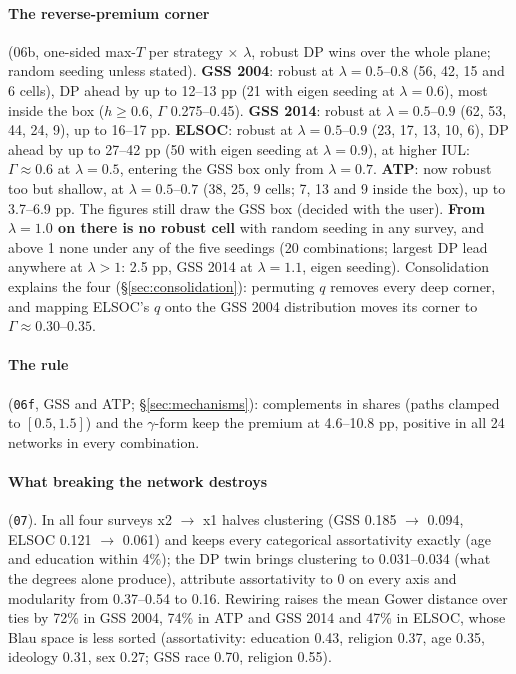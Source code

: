 \documentclass[11pt,a4paper]{article}
\newcommand{\code}[1]{\texttt{#1}}
\begin{document}
\paragraph{The reverse-premium corner} (06b, one-sided max-$T$ per strategy $\times$ $\lambda$, robust DP wins
over the whole plane; random seeding unless stated). \textbf{GSS 2004}: robust at $\lambda = 0.5$--$0.8$ (56,
42, 15 and 6 cells), DP ahead by up to 12--13 pp (21 with eigen seeding at $\lambda = 0.6$), most inside
the box ($h \ge 0.6$, $\Gamma$ 0.275--0.45). \textbf{GSS 2014}: robust at $\lambda = 0.5$--$0.9$ (62, 53, 44, 24, 9),
up to 16--17 pp. \textbf{ELSOC}: robust at $\lambda = 0.5$--$0.9$ (23, 17, 13, 10, 6), DP ahead by up to 27--42 pp
(50 with eigen seeding at $\lambda = 0.9$), at higher IUL: $\Gamma \approx 0.6$ at $\lambda = 0.5$, entering the
GSS box only from $\lambda = 0.7$. \textbf{ATP}: now robust too but shallow, at $\lambda = 0.5$--$0.7$ (38, 25,
9 cells; 7, 13 and 9 inside the box), up to 3.7--6.9 pp. The figures still draw the GSS box (decided with the
user). \textbf{From $\lambda = 1.0$ on there is no robust cell} with random seeding in any survey, and above 1
none under any of the five seedings (20 combinations; largest DP lead anywhere at $\lambda > 1$: 2.5 pp, GSS 2014 at
$\lambda = 1.1$, eigen seeding). Consolidation explains the four (\S\ref{sec:consolidation}): permuting $q$ removes
every deep corner, and mapping ELSOC's $q$ onto the GSS 2004 distribution moves its corner to $\Gamma \approx 0.30$--$0.35$.

\paragraph{The rule} (\code{06f}, GSS and ATP; \S\ref{sec:mechanisms}): complements in shares (paths clamped to
$[0.5, 1.5]$) and the $\gamma$-form keep the premium at 4.6--10.8 pp, positive in all 24 networks in every combination.

\paragraph{What breaking the network destroys} (\code{07}). In all four surveys x2 $\to$ x1 halves clustering
(GSS 0.185 $\to$ 0.094, ELSOC 0.121 $\to$ 0.061) and keeps every categorical assortativity exactly (age and
education within 4\%); the DP twin brings clustering to 0.031--0.034 (what the degrees alone produce),
attribute assortativity to 0 on every axis and modularity from 0.37--0.54 to 0.16. Rewiring raises the mean
Gower distance over ties by 72\% in GSS 2004, 74\% in ATP and GSS 2014 and 47\% in ELSOC, whose Blau space is
less sorted (assortativity: education 0.43, religion 0.37, age 0.35, ideology 0.31, sex 0.27; GSS race 0.70,
religion 0.55).
\end{document}
